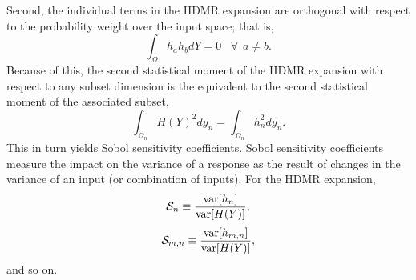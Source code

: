 Second, the individual terms in the HDMR expansion are orthogonal with respect to the probability weight over
the input space; that is,
\begin{equation}
  \int_\Omega h_a h_b dY = 0 \hspace{10pt}\forall\hspace{5pt} a\neq b.
\end{equation}
Because of this, the second statistical moment of the HDMR expansion with respect to any subset dimension is
the equivalent to the second statistical moment of the associated subset,
\begin{equation}
  \int_{\Omega_n} H(Y)^2 dy_n = \int_{\Omega_n} h_n^2 dy_n.
\end{equation}
This in turn yields Sobol sensitivity coefficients.  Sobol sensitivity coefficients measure the impact on the
variance of a response as the result of changes in the variance of an input (or combination of inputs).  For
the HDMR expansion,
\begin{equation}
  \mathcal{S}_n \equiv \frac{\text{var}\qty[h_n]}{\text{var}\qty[H(Y)]},
\end{equation}
\begin{equation}
  \mathcal{S}_{m,n} \equiv \frac{\text{var}\qty[h_{m,n}]}{\text{var}\qty[H(Y)]},
\end{equation}
and so on.

